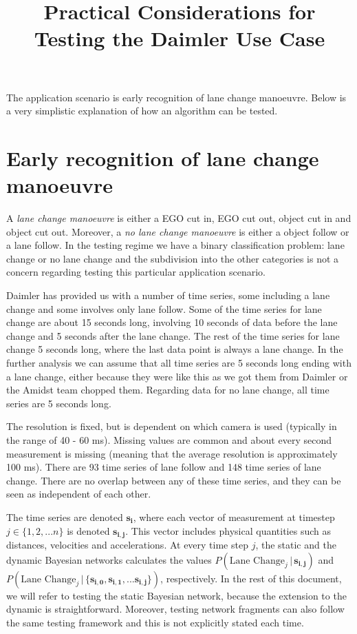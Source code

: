 \documentclass{article}
\title{Practical Considerations for Testing the Daimler Use Case}
\date{}
\theoremstyle{theorem}
\theoremstyle{definition}
\newcommand{\bu}[1]{\mathbf{#1}}
\newcommand{\bv}[1]{\bm{#1}}
\begin{document}
\maketitle

The application scenario is early recognition of lane change manoeuvre.  Below is a very simplistic explanation of how an algorithm can be tested. 

\section{Early recognition of lane change manoeuvre}

A \emph{lane change manoeuvre} is either a EGO cut in, EGO cut out, object cut in and object cut out. Moreover, a \emph{no lane change manoeuvre} is either a object follow or a lane follow.  In the testing regime we have a binary classification problem: lane change or no lane change and the subdivision into the other categories is not a concern regarding testing this particular application scenario.

Daimler has provided us with a number of time series, some including a lane change and some involves only lane follow. Some of the time series for lane change are about 15 seconds long, involving 10 seconds of data before the lane change and 5 seconds after the lane change. The rest of the time series for lane change 5 seconds long, where the last data point is always a lane change. In the further analysis we can assume that all time series are 5 seconds long ending with a lane change, either because they were like this as we got them from Daimler or the Amidst team chopped them. Regarding data  for no lane change, all time series are 5 seconds long.

The resolution is fixed, but is dependent on which camera is used (typically in the range of 40 - 60 ms).  Missing values are common and about every second measurement is missing (meaning that the average resolution is approximately 100 ms).  There are 93 time series of lane follow and 148 time series of lane change.  There are no overlap between any of these time series, and they can be seen as independent of each other.

The time series are denoted $\bu{s_i}$, where each vector of measurement at timestep $j \in \{1,2, ... n\}$ is denoted $\bv{s_{i,j}}$. This vector includes physical quantities such as distances, velocities and accelerations.  At every time step $j$, the static and the dynamic Bayesian networks calculates the values  $P(\mbox{Lane Change}_j \,|\,  \bv{s_{i,j}})$ and \\
$P(\mbox{Lane Change}_j \,|\, \{ \bv{s_{i,0}}, \bv{s_{i,1}}, ... \bv{s_{i,j}} \})$, respectively.  In the rest of this document, we will refer to testing the static Bayesian network, because the extension to the dynamic is straightforward.  Moreover, testing network fragments can also follow the same testing framework and this is not explicitly stated each time.
\end{document}
